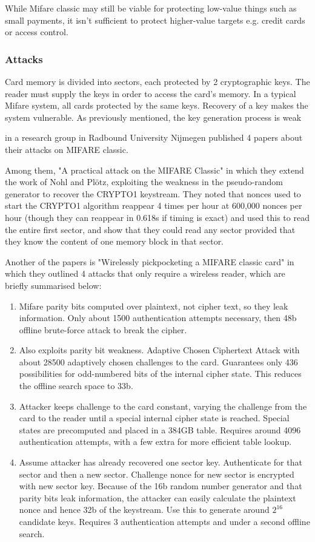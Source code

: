 \documentclass[12pt]{article}
\begin{document}
While Mifare classic may still be viable for protecting low-value things such as small payments, it isn't sufficient to protect higher-value targets e.g. credit cards or access control.

\subsubsection{Attacks}
Card memory is divided into sectors, each protected by 2 cryptographic keys. The reader must supply the keys in order to access the card's memory. In a typical Mifare system, all cards protected by the same keys. Recovery of a key makes the system vulnerable. As previously mentioned, the key generation process is weak

in a research group in Radbound University Nijmegen published 4 papers about their attacks on MIFARE classic. 

Among them, "A practical attack on the MIFARE Classic" in which they extend the work of Nohl and Pl\"otz, exploiting the weakness in the pseudo-random generator to recover the CRYPTO1 keystream. They noted that nonces used to start the CRYPTO1 algorithm reappear 4 times per hour at 600,000 nonces per hour (though they can reappear in 0.618s if timing is exact) and used this to read the entire first sector, and show that they could read any sector provided that they know the content of one memory block in that sector.

Another of the papers is "Wirelessly pickpocketing a MIFARE classic card" in which they outlined 4 attacks that only require a wireless reader, which are briefly summarised below:
\begin{enumerate}
	\item Mifare parity bits computed over plaintext, not cipher text, so they leak information. Only about 1500 authentication attempts necessary, then 48b offline brute-force attack to break the cipher.
	
	\item Also exploits parity bit weakness. Adaptive Chosen Ciphertext Attack with about 28500 adaptively chosen challenges to the card. Guarantees only 436 possibilities for odd-numbered bits of the internal cipher state. This reduces the offline search space to 33b.
	
	\item Attacker keeps challenge to the card constant, varying the challenge from the card to the reader until a special internal cipher state is reached. Special states are precomputed and placed in a 384GB table. Requires around 4096 authentication attempts, with a few extra for more efficient table lookup.
	
	\item Assume attacker has already recovered one sector key. Authenticate for that sector and then a new sector. Challenge nonce for new sector is encrypted with new sector key. Because of the 16b random number generator and that parity bits leak information, the attacker can easily calculate the plaintext nonce and hence 32b of the keystream. Use this to generate around $2^{16}$ candidate keys. Requires 3 authentication attempts and under a second offline search.
\end{enumerate}
\end{document}
